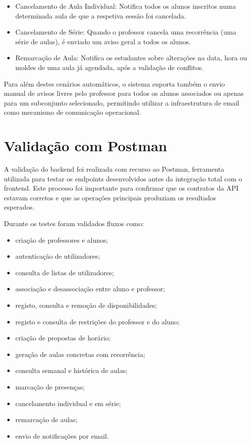 \begin{itemize}
    \item  Cancelamento de Aula Individual: Notifica todos os alunos inscritos numa determinada aula de que a respetiva sessão foi cancelada.
    \item Cancelamento de Série: Quando o professor cancela uma recorrência (uma série de aulas), é enviado um aviso geral a todos os alunos.
    \item Remarcação de Aula: Notifica os estudantes sobre alterações na data, hora ou moldes de uma aula já agendada, após a validação de conflitos.
\end{itemize}

Para além destes cenários automáticos, o sistema suporta também o envio manual de avisos livres pelo professor para todos os alunos associados ou apenas para um subconjunto selecionado, permitindo utilizar a infraestrutura de email como mecanismo de comunicação operacional.

\section{Validação com Postman}

A validação do backend foi realizada com recurso ao Postman, ferramenta utilizada para testar os endpoints desenvolvidos antes da integração total com o frontend.
Este processo foi importante para confirmar que os contratos da API estavam corretos e que as operações principais produziam os resultados esperados.

Durante os testes foram validados fluxos como:

\begin{itemize}
    \item criação de professores e alunos;
    \item autenticação de utilizadores;
    \item consulta de listas de utilizadores;
    \item associação e desassociação entre aluno e professor;
    \item registo, consulta e remoção de disponibilidades;
    \item registo e consulta de restrições do professor e do aluno;
    \item criação de propostas de horário;
    \item geração de aulas concretas com recorrência;
    \item consulta semanal e histórica de aulas;
    \item marcação de presenças;
    \item cancelamento individual e em série;
    \item remarcação de aulas;
    \item envio de notificações por email.
\end{itemize}

